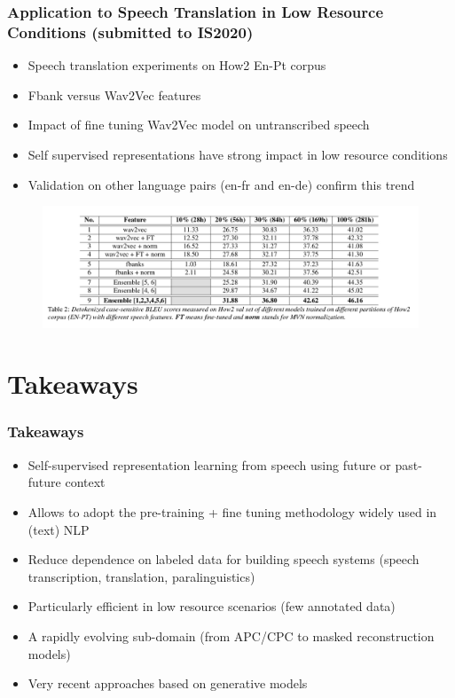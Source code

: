 \documentclass[table]{beamer}
\begin{document}
\begin{frame}
\frametitle{Application to Speech Translation in Low Resource Conditions (submitted to IS2020)}

		\begin{itemize}
			\item Speech translation experiments on How2 En-Pt corpus
			\item Fbank versus Wav2Vec features
			\item Impact of fine tuning Wav2Vec model on untranscribed speech 
			\item Self supervised representations have strong impact in low resource conditions
			\item Validation on other language pairs (en-fr and en-de) confirm this trend
			\end{itemize}

	\begin{figure}
			\centering
			\includegraphics[scale=0.27]	{how2ast} 
			\end{figure}



\end{frame}


\section{Takeaways}



\begin{frame}
\frametitle{Takeaways}

		\begin{itemize}
			\item Self-supervised representation learning from speech using future or past-future context
			\item Allows to adopt the pre-training + fine tuning methodology widely used in (text) NLP 
			\item Reduce dependence on labeled data for building speech systems (speech transcription, translation, paralinguistics)
			\item Particularly efficient in low resource scenarios (few annotated data)
			\item A rapidly evolving sub-domain (from APC/CPC to masked reconstruction models) 
			\item Very recent approaches based on generative models \citep{khurana2020convolutional}
		\end{itemize}
\end{frame}
\end{document}
